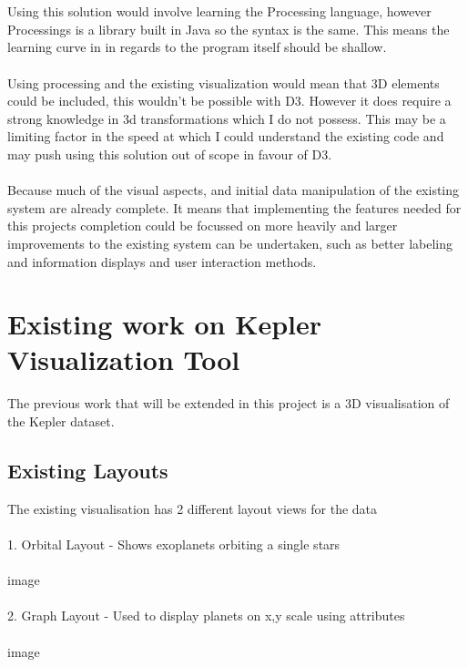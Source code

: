 \documentclass[11pt
              , a4paper
              , twoside
              , openright
              ]{report}
\begin{document}
\\\\
Using this solution would involve learning the Processing language, however Processings is a library built in Java so the syntax is the same. This means the learning curve in in regards to the program itself should be shallow.
\\\\
Using processing and the existing visualization would mean that 3D elements could be included, this wouldn’t be possible with D3. However it does require a strong knowledge in 3d transformations which I do not possess. This may be a limiting factor in the speed at which I could understand the existing code and may push using this solution out of scope in favour of D3.
\\\\
Because much of the visual aspects, and initial data manipulation of the existing system are already complete. It means that implementing the features needed for this projects completion could be focussed on more heavily and larger improvements to the existing system can be undertaken, such as better labeling and information displays and user interaction methods.
\section{Existing work on Kepler Visualization Tool}
The previous work that will be extended in this project is a 3D visualisation of the Kepler dataset.
\subsection{Existing Layouts}
The existing visualisation has 2 different layout views for the data
\\\\
1. Orbital Layout - Shows exoplanets orbiting a single stars\\\\
image
\\\\
2. Graph Layout - Used to display planets on x,y scale using attributes\\\\
image
\end{document}
